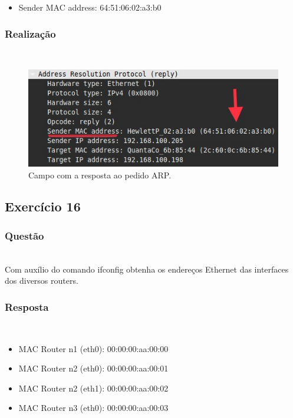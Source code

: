 \documentclass{llncs}
\begin{document}
\begin{itemize}
	\item Sender MAC address: 64:51:06:02:a3:b0
\end{itemize}

\subsubsection{Realização}\rule[-10pt]{0pt}{10pt}\\

\begin{figure}
  \begin{center}
	  \includegraphics[scale=0.6]{./imagens/arp_reply_resp.png} 
  \end{center}
	\caption{Campo com a resposta ao pedido ARP.}
  \label{fig:arp_reply_resp}
\end{figure} 


\clearpage
\subsection{Exercício 16}
\subsubsection{Questão}\rule[-10pt]{0pt}{10pt}\\

Com auxílio do comando ifconfig obtenha os endereços Ethernet das interfaces dos diversos routers.

\subsubsection{Resposta}\rule[-10pt]{0pt}{10pt}\\

\begin{itemize}
  \item MAC Router n1 (eth0): 00:00:00:aa:00:00
  \item MAC Router n2 (eth0): 00:00:00:aa:00:01
  \item MAC Router n2 (eth1): 00:00:00:aa:00:02
  \item MAC Router n3 (eth0): 00:00:00:aa:00:03
\end{itemize}
\end{document}
